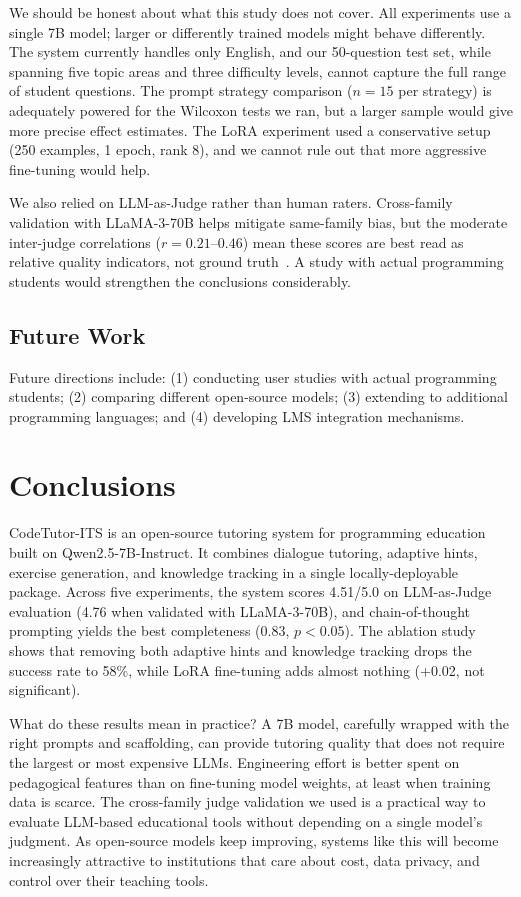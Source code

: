 \documentclass[applsci,article,submit,pdftex,moreauthors]{Definitions/mdpi}
\begin{document}
We should be honest about what this study does not cover. All experiments use a single 7B model; larger or differently trained models might behave differently. The system currently handles only English, and our 50-question test set, while spanning five topic areas and three difficulty levels, cannot capture the full range of student questions. The prompt strategy comparison ($n = 15$ per strategy) is adequately powered for the Wilcoxon tests we ran, but a larger sample would give more precise effect estimates. The LoRA experiment used a conservative setup (250 examples, 1 epoch, rank 8), and we cannot rule out that more aggressive fine-tuning would help.

We also relied on LLM-as-Judge rather than human raters. Cross-family validation with LLaMA-3-70B helps mitigate same-family bias, but the moderate inter-judge correlations ($r = 0.21$--$0.46$) mean these scores are best read as relative quality indicators, not ground truth~\cite{ref32}. A study with actual programming students would strengthen the conclusions considerably.

\subsection{Future Work}

Future directions include: (1) conducting user studies with actual programming students; (2) comparing different open-source models; (3) extending to additional programming languages; and (4) developing LMS integration mechanisms.

\section{Conclusions}

CodeTutor-ITS is an open-source tutoring system for programming education built on Qwen2.5-7B-Instruct. It combines dialogue tutoring, adaptive hints, exercise generation, and knowledge tracking in a single locally-deployable package. Across five experiments, the system scores 4.51/5.0 on LLM-as-Judge evaluation (4.76 when validated with LLaMA-3-70B), and chain-of-thought prompting yields the best completeness (0.83, $p < 0.05$). The ablation study shows that removing both adaptive hints and knowledge tracking drops the success rate to 58\%, while LoRA fine-tuning adds almost nothing (+0.02, not significant).

What do these results mean in practice? A 7B model, carefully wrapped with the right prompts and scaffolding, can provide tutoring quality that does not require the largest or most expensive LLMs. Engineering effort is better spent on pedagogical features than on fine-tuning model weights, at least when training data is scarce. The cross-family judge validation we used is a practical way to evaluate LLM-based educational tools without depending on a single model's judgment. As open-source models keep improving, systems like this will become increasingly attractive to institutions that care about cost, data privacy, and control over their teaching tools.
\end{document}
